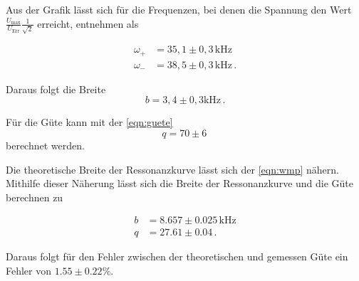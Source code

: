 \noindent
Aus der Grafik lässt sich für die Frequenzen, bei denen die Spannung den Wert $\frac{U_\text{max}}{U_\text{Err}}\frac{1}{\sqrt{2}}$ erreicht, entnehmen als

\begin{align*}
    \omega_+ &= 35,1 \pm 0,3 \,  \si{\kilo\hertz} \\
    \omega_- &= 38,5 \pm 0,3 \,  \si{\kilo\hertz} \, .
\end{align*}

\noindent
Daraus folgt die Breite 
\begin{equation*}
    b = 3,4 \pm 0,3 \si{\kilo\hertz} \, .
\end{equation*}

\noindent
Für die Güte kann mit der \autoref{eqn:guete} $$ q = 70 \pm 6 \, $$ berechnet werden. 

\noindent
Die theoretische Breite der Ressonanzkurve lässt sich der \autoref{eqn:wmp} nähern. Mithilfe dieser Näherung lässt sich die Breite der Ressonanzkurve und die Güte berechnen zu %

\begin{align*}
    b & = 8.657 \pm 0.025 \, \si{\kilo\hertz}\\
    q & = 27.61\pm 0.04 \, . 
\end{align*}

\noindent
Daraus folgt für den Fehler zwischen der theoretischen und gemessen Güte ein Fehler von $1.55 \pm 0.22 \si{\percent}$.